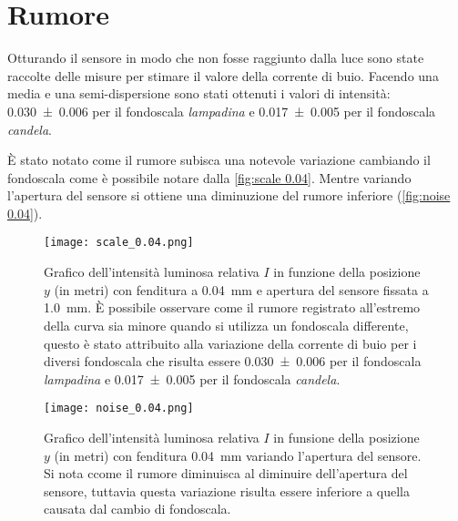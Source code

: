 \documentclass[../main.tex]{subfiles}
\begin{document}
\section{Rumore} \label{sec:rumore}

Otturando il sensore in modo che non fosse raggiunto dalla luce sono state raccolte delle misure per stimare il valore della corrente di buio. Facendo una media e una semi-dispersione sono stati ottenuti i valori di intensità: \num{0.030+-0.006} per il fondoscala \textit{lampadina} e \num{0.017+-0.005} per il fondoscala \textit{candela}.

È stato notato come il rumore subisca una notevole variazione cambiando il fondoscala come è possibile notare dalla \autoref{fig:scale 0.04}. Mentre variando l'apertura del sensore si ottiene una diminuzione del rumore inferiore (\autoref{fig:noise 0.04}).

\begin{figure}[ht!]
    \centering
    \texttt{[image: scale\_0.04.png]}
    \caption{Grafico dell'intensità luminosa relativa $I$ in funzione della posizione $y$ (in metri) con fenditura a \qty{0.04}{\mm} e apertura del sensore fissata a \qty{1.0}{\mm}. È possibile osservare come il rumore registrato all'estremo della curva sia minore quando si utilizza un fondoscala differente, questo è stato attribuito alla variazione della corrente di buio per i diversi fondoscala che risulta essere \num{0.030+-0.006} per il fondoscala \textit{lampadina} e \num{0.017+-0.005} per il fondoscala \textit{candela}.} %
    \label{fig:scale 0.04}
\end{figure}

\begin{figure}[ht!]
    \texttt{[image: noise\_0.04.png]}
    \caption{Grafico dell'intensità luminosa relativa $I$  in funsione della posizione $y$ (in metri) con fenditura \qty{0.04}{\mm} variando l'apertura del sensore. Si nota ccome il rumore diminuisca al diminuire dell'apertura del sensore, tuttavia questa variazione risulta essere inferiore a quella causata dal cambio di fondoscala.}
    \label{fig:noise 0.04}
\end{figure}
\end{document}
